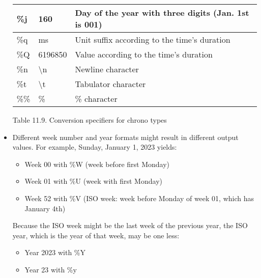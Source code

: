 \begin{itemize}
\begin{longtable}[c]{|lll|}
\multicolumn{1}{|l|}{\%j}            & \multicolumn{1}{l|}{160}               & Day of the year with three digits (Jan. 1st is 001)             \\ \hline
\multicolumn{1}{|l|}{\%q}            & \multicolumn{1}{l|}{ms}                & Unit suffix according to the time's duration                    \\ \hline
\multicolumn{1}{|l|}{\%Q}            & \multicolumn{1}{l|}{6196850}           & Value according to the time's duration                          \\ \hline
\multicolumn{1}{|l|}{\%n}            & \multicolumn{1}{l|}{\textbackslash{}n} & Newline character                                               \\ \hline
\multicolumn{1}{|l|}{\%t}            & \multicolumn{1}{l|}{\textbackslash{}t} & Tabulator character                                             \\ \hline
\multicolumn{1}{|l|}{\%\%}           & \multicolumn{1}{l|}{\%}                & \% character                                                    \\ \hline
\end{longtable}

\begin{center}
Table 11.9. Conversion specifiers for chrono types
\end{center}

\item 
Different week number and year formats might result in different output values.
For example, Sunday, January 1, 2023 yields:

\begin{itemize}
\item 
Week 00 with \%W (week before first Monday)

\item 
Week 01 with \%U (week with first Monday)

\item 
Week 52 with \%V (ISO week: week before Monday of week 01, which has January 4th)
\end{itemize}

Because the ISO week might be the last week of the previous year, the ISO year, which is the year of that week, may be one less:

\begin{itemize}
\item 
Year 2023 with \%Y

\item 
Year 23 with \%y


\end{itemize}
\end{itemize}
